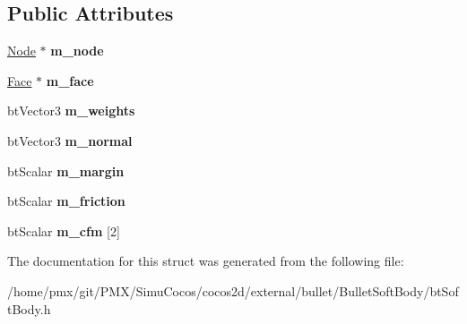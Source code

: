 \subsection*{Public Attributes}
\begin{DoxyCompactItemize}
\item 
\mbox{\label{structbtSoftBody_1_1SContact_a969a9b23a1b807135afb300daa9f3901}} 
\hyperlink{structbtSoftBody_1_1Node}{Node} $\ast$ {\bfseries m\+\_\+node}
\item 
\mbox{\label{structbtSoftBody_1_1SContact_af232d111cf7074bc17075ea754658c76}} 
\hyperlink{structbtSoftBody_1_1Face}{Face} $\ast$ {\bfseries m\+\_\+face}
\item 
\mbox{\label{structbtSoftBody_1_1SContact_acc26bf2b8d7f3ee7528030336aefa5df}} 
bt\+Vector3 {\bfseries m\+\_\+weights}
\item 
\mbox{\label{structbtSoftBody_1_1SContact_a8024b61fae8c8531d7bb083d0e5b23a4}} 
bt\+Vector3 {\bfseries m\+\_\+normal}
\item 
\mbox{\label{structbtSoftBody_1_1SContact_abda6249445903b4e143ecd1d537a4303}} 
bt\+Scalar {\bfseries m\+\_\+margin}
\item 
\mbox{\label{structbtSoftBody_1_1SContact_ad094c94c16a779ee3982392400f7ac47}} 
bt\+Scalar {\bfseries m\+\_\+friction}
\item 
\mbox{\label{structbtSoftBody_1_1SContact_acd2e9e6885709d44581565c49bb0872f}} 
bt\+Scalar {\bfseries m\+\_\+cfm} \mbox{[}2\mbox{]}
\end{DoxyCompactItemize}


The documentation for this struct was generated from the following file\+:\begin{DoxyCompactItemize}
\item 
/home/pmx/git/\+P\+M\+X/\+Simu\+Cocos/cocos2d/external/bullet/\+Bullet\+Soft\+Body/bt\+Soft\+Body.\+h\end{DoxyCompactItemize}

